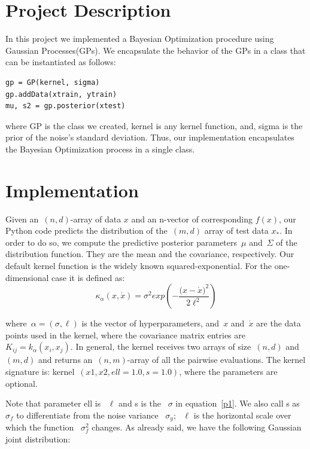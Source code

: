 \documentclass[]{IEEEtran}
\begin{document}
\section{Project Description}
In this project we implemented a Bayesian Optimization procedure using Gaussian Processes(GPs). We encapsulate the behavior of the GPs in a class that can be instantiated as follows:

\begin{verbatim}
gp = GP(kernel, sigma) 
gp.addData(xtrain, ytrain) 
mu, s2 = gp.posterior(xtest)
\end{verbatim}

where GP is the class we created, kernel is any kernel function, and, sigma is the prior of the noise’s standard deviation. Thus, our implementation encapsulates the Bayesian Optimization process in a single class.

\section{Implementation}
\label{imple}
Given an~\((n,d)\)-array of data $x$  and an n-vector of corresponding $f(x)$, our Python code predicts the distribution of the~\((m,d)\) array of test data $x_*$.
In order to do so, we compute the predictive posterior parameters~\(\mu \) and~\(\Sigma \) of the distribution function. They are the mean and the covariance, respectively. Our default kernel function is the widely known squared-exponential. For the one-dimensional case it is defined as: 
\begin{equation}
{ \kappa  }_{ \alpha  }({ x },\acute { x } )={ \sigma  }^{ 2 }exp\left( -\frac { { { ({ x }-\acute { x }  }) }^{ 2 } }{ 2{ \ell  }^{ 2 } }  \right) 
\label{p1}
\end{equation}

where~\( \alpha =(\sigma ,\ell )\) is the vector of hyperparameters, and~\(x\) and~\(\acute { x }\) are the data points used in the kernel, where the covariance matrix entries are~\({ K }_{ ij }={ k }_{ \alpha  }\left( { x }_{ i },{ x }_{ j } \right) \). In general, the kernel receives two arrays of size~\((n,d)\) and~\((m,d)\) and returns an~\((n,m)\)-array of all the pairwise evaluations. The kernel signature is: kernel~\((x1, x2, ell=1.0, s =1.0)\), where the parameters are optional. \par
Note that parameter ell is ~\(\ell\) and s is the ~\(\sigma\) in equation~\ref{p1}. We also call s as ~\({\sigma}_{f}\) to differentiate from the noise variance ~\({\sigma}_{y}\); 
~\(\ell\) is the horizontal scale over which the function ~\({ \sigma  }_{ f }^{ 2 }\) changes. 
As already said, we have the following Gaussian joint distribution:
\end{document}
